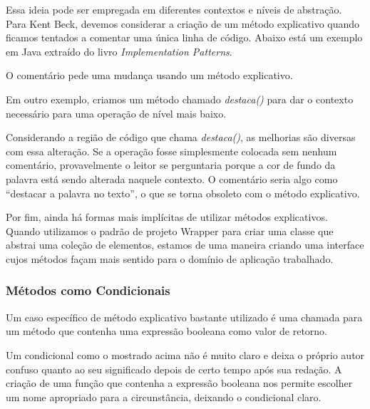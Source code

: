 Essa ideia pode ser empregada em diferentes contextos e níveis de abstração. Para Kent Beck, devemos considerar a criação de um método explicativo quando ficamos tentados a comentar uma única linha de código. Abaixo está um exemplo em Java extraído do livro \textit{Implementation Patterns}.



O comentário pede uma mudança usando um método explicativo.
	


Em outro exemplo, criamos um método chamado \textit{destaca()} para dar o contexto necessário para uma operação de nível mais baixo. 



Considerando a região de código que chama \textit{destaca()}, as melhorias são diversas com essa alteração. Se a operação fosse simplesmente colocada sem nenhum comentário, provavelmente o leitor se perguntaria porque a cor de fundo da palavra está sendo alterada naquele contexto. O comentário seria algo como “destacar a palavra no texto”, o que se torna obsoleto com o método explicativo. 

Por fim, ainda há formas mais implícitas de utilizar métodos explicativos. Quando utilizamos o padrão de projeto Wrapper \citep{GOF95} para criar uma classe que abstrai uma coleção de elementos, estamos de uma maneira criando uma interface cujos métodos façam mais sentido para o domínio de aplicação trabalhado.

\subsubsection{Métodos como Condicionais}
\label{metodos:condicionais}
Um caso específico de método explicativo bastante utilizado é uma chamada para um método que contenha uma expressão booleana como valor de retorno.
	


Um condicional como o mostrado acima não é muito claro e deixa o próprio autor confuso quanto ao seu significado depois de certo tempo após sua redação. A criação de uma função que contenha a expressão booleana nos permite escolher um nome apropriado para a circunstância, deixando o condicional claro.

